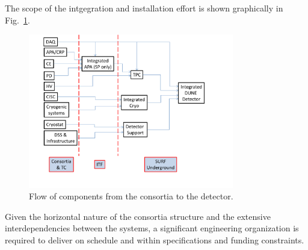 The scope of the intgegration and installation effort is shown
graphically in Fig.~\ref{fig:TC_flow}.
\begin{figure}[htb]
  \begin{center}
    \includegraphics[width=0.8\textwidth]{far-detector-generic/figures/DUNE_deliverable_flow}
    \caption{Flow of components from the consortia to the detector.}
    \label{fig:TC_flow}
  \end{center}
\end{figure}





Given the horizontal nature of the consortia structure and the
extensive interdependencies between the systems, a significant
engineering organization is required to deliver  on
schedule and within specifications and funding constraints.


